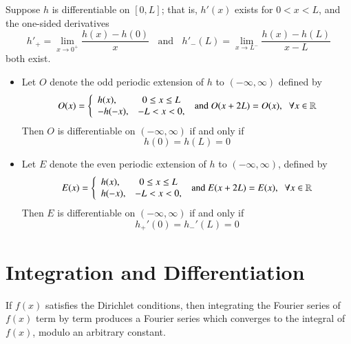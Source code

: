 \documentclass[12pt, a4paper, oneside, openright, titlepage]{book}
\begin{document}
\begin{thm}
    Suppose $h$ is differentiable on $[0,L]$; that is, $h'(x)$ exists for $0 < x< L$, and the one-sided derivatives \begin{equation*}
        h'_+ = \lim\limits_{x\rightarrow 0^+}\frac{h(x)-h(0)}{x}\;\;\text{ and }\;\;h'_-(L) = \lim\limits_{x\rightarrow L^-}\frac{h(x) - h(L)}{x-L}
    \end{equation*}
    both exist. \begin{itemize}
        \item Let $O$ denote the odd periodic extension of $h$ to $(-\infty,\infty)$ defined by \begin{equation*}
                O(x) = \left\{\begin{array}{lc} h(x), & 0 \leq x \leq L \\ -h(-x), & -L < x < 0,\end{array}\right.\text{ and } O(x+2L) = O(x),\;\;\forall x \in \mathbb R
        \end{equation*}
            Then $O$ is differentiable on $(-\infty,\infty)$ if and only if \begin{equation*}
                h(0) = h(L) = 0
            \end{equation*}
        \item Let $E$ denote the even periodic extension of $h$ to $(-\infty, \infty)$, defined by \begin{equation*}
                E(x) = \left\{\begin{array}{lc} h(x), & 0 \leq x \leq L \\ h(-x), & -L < x < 0,\end{array}\right.\text{ and } E(x+2L) = E(x),\;\;\forall x \in \mathbb R
        \end{equation*}
            Then $E$ is differentiable on $(-\infty,\infty)$ if and only if \begin{equation*}
                h_+'(0) = h_-'(L) = 0
            \end{equation*}
    \end{itemize}
\end{thm}





\section{Integration and Differentiation}

\begin{thm}
    If $f(x)$ satisfies the Dirichlet conditions, then integrating the Fourier series of $f(x)$ term by term produces a Fourier series which converges to the integral of $f(x)$, modulo an arbitrary constant.
\end{thm}
\end{document}
